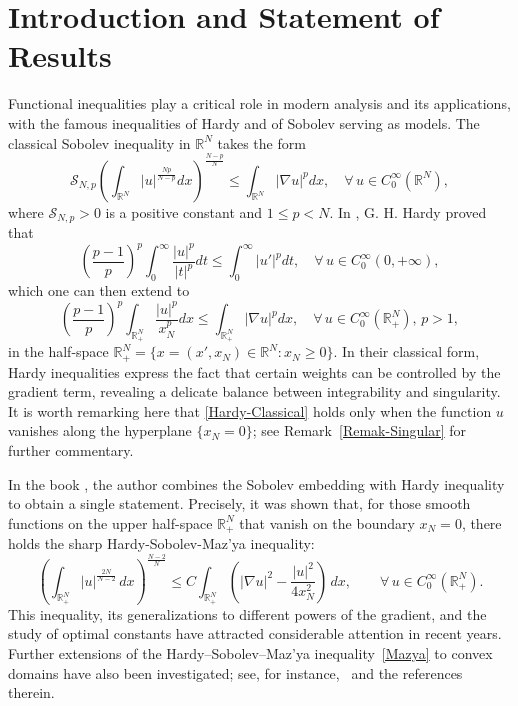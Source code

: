\documentclass[12pt]{amsart}
\theoremstyle{definition}
\theoremstyle{plain}
\begin{document}
	\begin{center}
		\begin{minipage}{8cm}
		\footnotesize
		\tableofcontents
		\end{minipage}
	\end{center}
	
	
\section{Introduction and Statement of Results} 

Functional inequalities play a critical role in modern analysis and 
its applications, with the famous inequalities of Hardy and of Sobolev serving 
as models. The classical Sobolev inequality in 
$\mathbb{R}^N$ takes the form 
\begin{equation}\label{Sobolev-Classical} 
\mathcal{S}_{N,p} 
\left (\int_{\mathbb{R}^N} |u|^{\frac{Np}{N-p}} dx \right )^{\frac{N-p}{N}} \leq \int_{\mathbb{R}^N} |\nabla u|^p dx, 
\quad \forall \, u \in C_0^\infty (\mathbb{R}^N),
\end{equation} 
where $\mathcal{S}_{N,p}>0$ is a positive constant and $1\leq p <N$. In \cite{Hardy1}, G. H. Hardy 
proved that  
$$
\left(\frac{p-1}{p}\right)^p \int_0^\infty \frac{|u|^p}{|t|^p} dt\leq \int_0^{\infty} |u'|^p
dt, \quad \forall \,u\in C_0^\infty (0,+\infty),
$$
which one can then extend to 
\begin{equation}\label{Hardy-Classical}
		\left(\frac{p-1}{p}\right)^p\int_{\mathbb{R}^N_+} \frac{|u|^p}{x_N^{p}}dx
        \leq\int_{\mathbb{R}^N_+} |\nabla u|^pdx,\quad \forall \,u\in C_0^\infty (\mathbb{R}^N_+), \, p>1,
	\end{equation}
in the half-space $\mathbb{R}^N_+ = \{ x= (x', x_N) \in \mathbb{R}^N: x_N 
\geq 0\}$. In their classical form, Hardy inequalities express the fact that 
certain weights can be controlled by the gradient term, revealing a delicate balance between 
integrability and singularity. It is worth remarking here that \eqref{Hardy-Classical}
holds only when the function $u$ vanishes along the hyperplane $\{ x_N = 0\}$; 
see Remark~\ref{Remak-Singular} for further commentary. 

In the book \cite{Mazya}, the author combines the Sobolev embedding with Hardy inequality to 
obtain a single statement. Precisely, it was shown that, for those smooth functions 
on the upper half-space
$\mathbb{R}^N_+$ that vanish on the boundary $x_N =0$,  there holds the sharp Hardy-Sobolev-Maz’ya inequality:
\begin{equation}\label{Mazya}
\left(
\int_{\mathbb{R}^N_+} 
|u|^{\frac{2N}{N-2}} \, dx
\right)^{\!\frac{N-2}{N}}
\leq 
C \int_{\mathbb{R}^N_+} 
\left( 
|\nabla u|^2 - \frac{|u|^2}{4x_N^2}
\right) \, dx,
\qquad \forall\,
u \in C_0^\infty(\mathbb{R}^N_+).
\end{equation}
This inequality, its generalizations to different powers of the gradient, and the 
study of optimal 
constants have attracted considerable attention in recent years.  
Further extensions of the Hardy–Sobolev–Maz’ya inequality~\eqref{Mazya} to convex domains have 
also been investigated; see, for instance,~\cite{Filippas-Terticlas1,  Frank-Loss} 
and the references therein. 
\end{document}
